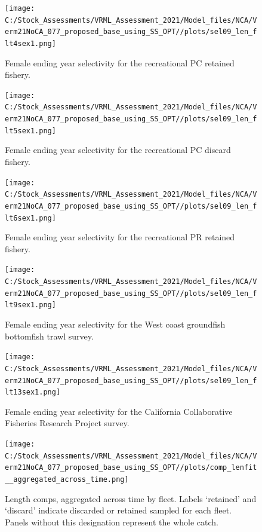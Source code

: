 \documentclass[
  english,
  a4paper,
]{article}
\begin{document}
\begin{figure}
\centering
\texttt{[image: C:/Stock\_Assessments/VRML\_Assessment\_2021/Model\_files/NCA/Verm21NoCA\_077\_proposed\_base\_using\_SS\_OPT//plots/sel09\_len\_flt4sex1.png]}
\caption{Female ending year selectivity for the recreational PC retained fishery.\label{fig:endyr-selex-REC-PC}}
\end{figure}

\begin{figure}
\centering
\texttt{[image: C:/Stock\_Assessments/VRML\_Assessment\_2021/Model\_files/NCA/Verm21NoCA\_077\_proposed\_base\_using\_SS\_OPT//plots/sel09\_len\_flt5sex1.png]}
\caption{Female ending year selectivity for the recreational PC discard fishery.\label{fig:endyr-selex-REC-PC-DIS}}
\end{figure}

\begin{figure}
\centering
\texttt{[image: C:/Stock\_Assessments/VRML\_Assessment\_2021/Model\_files/NCA/Verm21NoCA\_077\_proposed\_base\_using\_SS\_OPT//plots/sel09\_len\_flt6sex1.png]}
\caption{Female ending year selectivity for the recreational PR retained fishery.\label{fig:endyr-selex-REC-PR}}
\end{figure}

\begin{figure}
\centering
\texttt{[image: C:/Stock\_Assessments/VRML\_Assessment\_2021/Model\_files/NCA/Verm21NoCA\_077\_proposed\_base\_using\_SS\_OPT//plots/sel09\_len\_flt9sex1.png]}
\caption{Female ending year selectivity for the West coast groundfish bottomfish trawl survey.\label{fig:endyr-selex-NWFSC-TWL}}
\end{figure}

\begin{figure}
\centering
\texttt{[image: C:/Stock\_Assessments/VRML\_Assessment\_2021/Model\_files/NCA/Verm21NoCA\_077\_proposed\_base\_using\_SS\_OPT//plots/sel09\_len\_flt13sex1.png]}
\caption{Female ending year selectivity for the California Collaborative Fisheries Research Project survey.\label{fig:endyr-selex-CCFRP}}
\end{figure}

\FloatBarrier

\clearpage
\FloatBarrier

\FloatBarrier

\begin{figure}
\centering
\texttt{[image: C:/Stock\_Assessments/VRML\_Assessment\_2021/Model\_files/NCA/Verm21NoCA\_077\_proposed\_base\_using\_SS\_OPT//plots/comp\_lenfit\_\_aggregated\_across\_time.png]}
\caption{Length comps, aggregated across time by fleet.
Labels `retained' and `discard' indicate discarded or retained sampled for each fleet. Panels without this designation represent the whole catch.\label{fig:lenfits-all}}
\end{figure}
\end{document}

